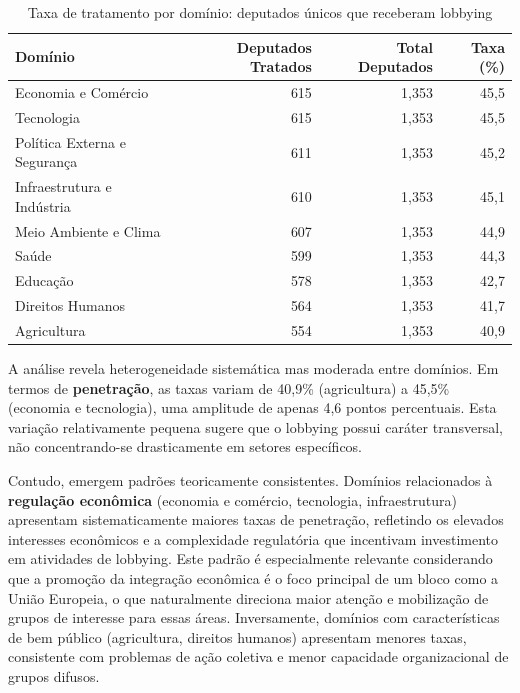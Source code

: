 \begin{table}[htbp]
    \centering
    \caption{Taxa de tratamento por domínio: deputados únicos que receberam lobbying}
    \label{tab:domain_treatment_rates}
    \begin{tabular}{lrrr}
    \toprule
    \textbf{Domínio} & \textbf{Deputados Tratados} & \textbf{Total Deputados} & \textbf{Taxa (\%)} \\
    \midrule
    Economia e Comércio & 615 & 1{,}353 & 45{,}5 \\
    Tecnologia & 615 & 1{,}353 & 45{,}5 \\
    Política Externa e Segurança & 611 & 1{,}353 & 45{,}2 \\
    Infraestrutura e Indústria & 610 & 1{,}353 & 45{,}1 \\
    Meio Ambiente e Clima & 607 & 1{,}353 & 44{,}9 \\
    Saúde & 599 & 1{,}353 & 44{,}3 \\
    Educação & 578 & 1{,}353 & 42{,}7 \\
    Direitos Humanos & 564 & 1{,}353 & 41{,}7 \\
    Agricultura & 554 & 1{,}353 & 40{,}9 \\
    \bottomrule
    \end{tabular}
    \end{table}

A análise revela heterogeneidade sistemática mas moderada entre domínios. Em termos de \textbf{penetração}, as taxas variam de 40,9\% (agricultura) a 45,5\% (economia e tecnologia), uma amplitude de apenas 4,6 pontos percentuais. Esta variação relativamente pequena sugere que o lobbying possui caráter transversal, não concentrando-se drasticamente em setores específicos.

Contudo, emergem padrões teoricamente consistentes. Domínios relacionados à \textbf{regulação econômica} (economia e comércio, tecnologia, infraestrutura) apresentam sistematicamente maiores taxas de penetração, refletindo os elevados interesses econômicos e a complexidade regulatória que incentivam investimento em atividades de lobbying. Este padrão é especialmente relevante considerando que a promoção da integração econômica é o foco principal de um bloco como a União Europeia, o que naturalmente direciona maior atenção e mobilização de grupos de interesse para essas áreas. Inversamente, domínios com características de bem público (agricultura, direitos humanos) apresentam menores taxas, consistente com problemas de ação coletiva e menor capacidade organizacional de grupos difusos.


